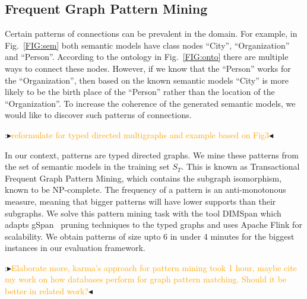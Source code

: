\documentclass[letterpaper]{article} %
\newcommand{\authornote}[3]{
  {\fbox{\sc 
  #1}:$\blacktriangleright$\textcolor{#2}{\small{#3}}$\blacktriangleleft$}%
}
\newcommand{\npr}[1]{\authornote{NPR}{orange}{#1}}
\begin{document}
\subsection{Frequent Graph Pattern Mining \label{SSEC:pattern-mining}}

Certain patterns of connections can be prevalent in the domain.
For example, in Fig.~\ref{FIG:sem} both semantic models have class nodes ``City'', ``Organization'' and ``Person''.
According to the ontology in Fig.~\ref{FIG:onto} there are multiple ways to connect these nodes.
However, if we know that the ``Person'' works for the ``Organization'', then based on the known semantic models ``City'' is more likely to be the birth place of the ``Person'' rather than the location of the ``Organization''.
To increase the coherence of the generated semantic models, we would like to discover such patterns of connections.


\npr{reformulate for typed directed multigraphs and example based on Fig3}
In our context, patterns are typed directed graphs.
We mine these patterns from the set of semantic models in the training set $S_T$.
This is known as Transactional Frequent Graph Pattern Mining, which contains the subgraph 
isomorphism, known to be NP-complete.
The frequency of a pattern is an anti-monotonous measure, meaning that bigger patterns will have lower supports than their subgraphs.
We solve this pattern mining task with the tool DIMSpan \cite{petermann2017dimspan} which adapts gSpan~\cite{yan2002gspan} pruning techniques to the typed graphs and uses Apache Flink for scalability.  
We obtain patterns of size upto 6 in under 4 minutes for the biggest instances in our evaluation framework. 
\npr{Elaborate more, karma's approach for pattern mining took 1 hour, maybe cite my work on how databases perform for graph pattern matching. Should it be better in related work?}


\end{document}

